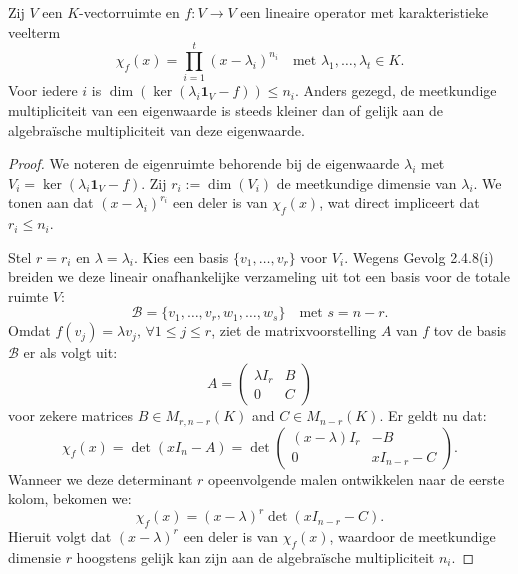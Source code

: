 \begin{lemma}[6.3.9]
    Zij $V$ een $K$-vectorruimte en $f \colon V \to V$ een lineaire operator met karakteristieke veelterm
    \[ \chi_f(x) = \prod_{i=1}^t (x - \lambda_i)^{n_i} \quad \text{met } \lambda_1, \dots, \lambda_t \in K. \]
    Voor iedere $i$ is $\dim(\operatorname{ker}(\lambda_i \mathbf{1}_V - f)) \le n_i$. Anders gezegd, de meetkundige multipliciteit van een eigenwaarde is steeds kleiner dan of gelijk aan de algebraïsche multipliciteit van deze eigenwaarde.
\end{lemma}
\begin{proof}
    We noteren de eigenruimte behorende bij de eigenwaarde $\lambda_i$ met $V_i = \ker(\lambda_i \mathbf{1}_V - f)$.
     Zij $r_i := \dim(V_i)$ de meetkundige dimensie van $\lambda_i$.
      We tonen aan dat $(x-\lambda_i)^{r_i}$ een deler is van $\chi_f(x)$,
      wat direct impliceert dat $r_i \le n_i$.

    Stel $r = r_i$ en $\lambda = \lambda_i$.
     Kies een basis $\{v_1, \dots, v_r\}$ voor $V_i$.
      Wegens Gevolg 2.4.8(i) breiden we deze lineair onafhankelijke verzameling uit tot een basis voor de totale ruimte $V$:
    \[ \mathcal{B} = \{v_1, \dots, v_r, w_1, \dots, w_s\} \quad \text{met } s = n - r. \]
    Omdat $f(v_j) = \lambda v_j , \, \forall 1 \le j \le r$, 
    ziet de matrixvoorstelling $A$ van $f$ tov de basis $\mathcal{B}$ er als volgt uit:
    \[ A = \begin{pmatrix} \lambda I_r & B \\ 0 & C \end{pmatrix} \]
    voor zekere matrices $B \in M_{r,n-r}(K)$ and $C \in M_{n-r}(K)$. Er geldt nu dat:
    \[ \chi_f(x) = \det(x I_n - A) = \det \begin{pmatrix} (x - \lambda) I_r & -B \\ 0 & x I_{n-r} - C \end{pmatrix}. \]
    Wanneer we deze determinant $r$ opeenvolgende malen ontwikkelen naar de eerste kolom, bekomen we:
    \[ \chi_f(x) = (x - \lambda)^r \det(x I_{n-r} - C). \]
    Hieruit volgt dat $(x - \lambda)^r$ een deler is van $\chi_f(x)$, waardoor de meetkundige dimensie $r$ hoogstens gelijk kan zijn aan de algebraïsche multipliciteit $n_i$.
\end{proof}

